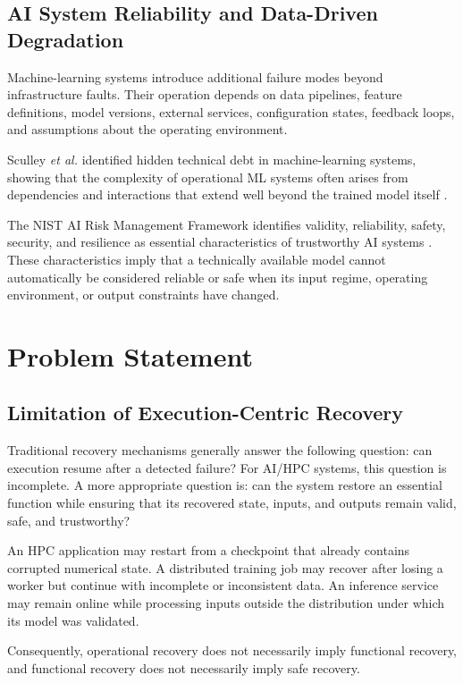 \documentclass[conference]{IEEEtran}
\begin{document}
\subsection{AI System Reliability and Data-Driven Degradation}

Machine-learning systems introduce additional failure modes beyond infrastructure faults. Their operation depends on data pipelines, feature definitions, model versions, external services, configuration states, feedback loops, and assumptions about the operating environment.

Sculley \emph{et al.} identified hidden technical debt in machine-learning systems, showing that the complexity of operational ML systems often arises from dependencies and interactions that extend well beyond the trained model itself \cite{sculley2015}.

The NIST AI Risk Management Framework identifies validity, reliability, safety, security, and resilience as essential characteristics of trustworthy AI systems \cite{nist2023}. These characteristics imply that a technically available model cannot automatically be considered reliable or safe when its input regime, operating environment, or output constraints have changed.

\section{Problem Statement}

\subsection{Limitation of Execution-Centric Recovery}

Traditional recovery mechanisms generally answer the following question: can execution resume after a detected failure? For AI/HPC systems, this question is incomplete. A more appropriate question is: can the system restore an essential function while ensuring that its recovered state, inputs, and outputs remain valid, safe, and trustworthy?

An HPC application may restart from a checkpoint that already contains corrupted numerical state. A distributed training job may recover after losing a worker but continue with incomplete or inconsistent data. An inference service may remain online while processing inputs outside the distribution under which its model was validated.

Consequently, operational recovery does not necessarily imply functional recovery, and functional recovery does not necessarily imply safe recovery.
\end{document}
